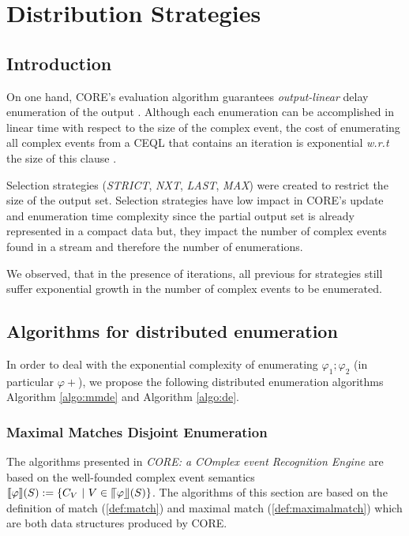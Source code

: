 \chapter{Distribution Strategies}\label{chap:distribution_strategies}

\section{Introduction}
\label{sec:introduction}

On one hand, CORE's evaluation algorithm guarantees \textit{output-linear} delay enumeration of the output \cite{core}.
Although each enumeration can be accomplished in linear time with respect to the size of the complex event,
the cost of enumerating all complex events from a CEQL that contains an iteration is exponential \textit{w.r.t} the size of this clause \cite{grez_et_al:LIPIcs:2019:10307}.

Selection strategies (\textit{STRICT}, \textit{NXT}, \textit{LAST}, \textit{MAX}) were created to restrict the size of the output set.
Selection strategies have low impact in CORE's update and enumeration time complexity since the partial output set is already represented in a compact data but, they impact the number of complex events found in a stream and therefore the number of enumerations.

We observed, that in the presence of iterations, all previous for strategies still suffer exponential growth in the number of complex events to be enumerated.

\section{Algorithms for distributed enumeration}
\label{sec:algorithm}

In order to deal with the exponential complexity of enumerating $\varphi_{1} ; \varphi_{2}$ (in particular $\varphi+$), we propose the following distributed enumeration algorithms Algorithm \ref{algo:mmde} and Algorithm \ref{algo:de}.

\subsection{Maximal Matches Disjoint Enumeration}
\label{subsec:mmde}

The algorithms presented in \textit{CORE: a COmplex event Recognition Engine} are based on the well-founded complex event semantics $\llbracket \varphi \rrbracket (S) := \{ C_{V} \ | \ V \in \llceil \varphi \rrfloor (S) \}$. The algorithms of this section are based on the definition of match (\ref{def:match}) and maximal match (\ref{def:maximalmatch}) which are both data structures produced by CORE.

